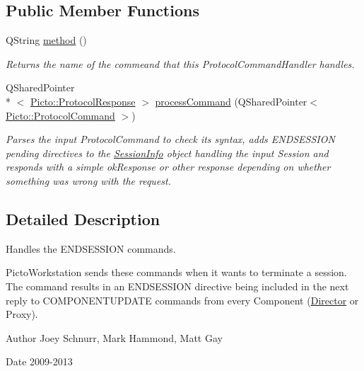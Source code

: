 \subsection*{Public Member Functions}
\begin{DoxyCompactItemize}
\item 
\hypertarget{struct_endsession_command_handler_a4acd49809e509ec762f21b56257533f7}{Q\-String \hyperlink{struct_endsession_command_handler_a4acd49809e509ec762f21b56257533f7}{method} ()}\label{struct_endsession_command_handler_a4acd49809e509ec762f21b56257533f7}

\begin{DoxyCompactList}\small\item\em Returns the name of the commeand that this Protocol\-Command\-Handler handles. \end{DoxyCompactList}\item 
\hypertarget{struct_endsession_command_handler_a54844ad1ce38d760f30a2254e924d9fb}{Q\-Shared\-Pointer\\*
$<$ \hyperlink{struct_picto_1_1_protocol_response}{Picto\-::\-Protocol\-Response} $>$ \hyperlink{struct_endsession_command_handler_a54844ad1ce38d760f30a2254e924d9fb}{process\-Command} (Q\-Shared\-Pointer$<$ \hyperlink{struct_picto_1_1_protocol_command}{Picto\-::\-Protocol\-Command} $>$)}\label{struct_endsession_command_handler_a54844ad1ce38d760f30a2254e924d9fb}

\begin{DoxyCompactList}\small\item\em Parses the input Protocol\-Command to check its syntax, adds E\-N\-D\-S\-E\-S\-S\-I\-O\-N pending directives to the \hyperlink{class_session_info}{Session\-Info} object handling the input Session and responds with a simple ok\-Response or other response depending on whether something was wrong with the request. \end{DoxyCompactList}\end{DoxyCompactItemize}


\subsection{Detailed Description}
Handles the E\-N\-D\-S\-E\-S\-S\-I\-O\-N commands. 

Picto\-Workstation sends these commands when it wants to terminate a session. The command results in an E\-N\-D\-S\-E\-S\-S\-I\-O\-N directive being included in the next reply to C\-O\-M\-P\-O\-N\-E\-N\-T\-U\-P\-D\-A\-T\-E commands from every Component (\hyperlink{class_director}{Director} or Proxy). \begin{DoxyAuthor}{Author}
Joey Schnurr, Mark Hammond, Matt Gay 
\end{DoxyAuthor}
\begin{DoxyDate}{Date}
2009-\/2013 
\end{DoxyDate}



